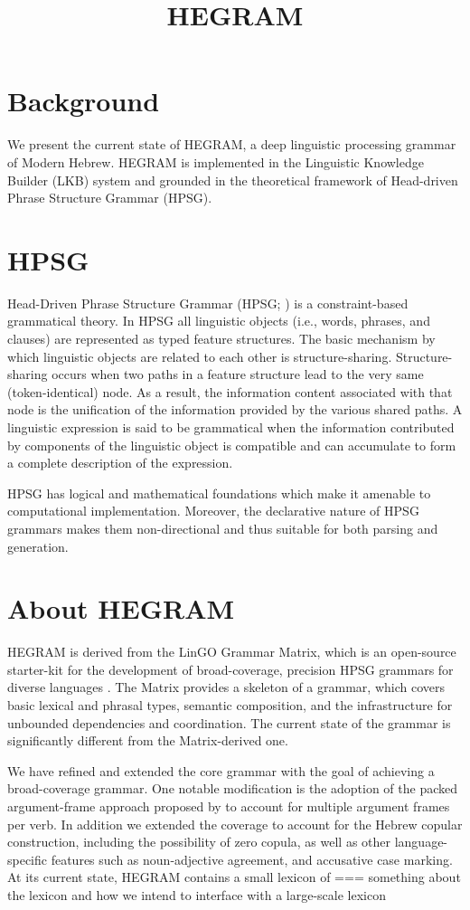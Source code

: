 \documentclass[a4paper]{article}
\title{HEGRAM}
\begin{document}
\section{Background}
We present the current state of HEGRAM, a deep linguistic processing grammar of Modern Hebrew. HEGRAM is implemented in the
Linguistic Knowledge Builder (LKB) system and grounded in the theoretical framework of
Head-driven Phrase Structure Grammar (HPSG).

\section{HPSG}
Head-Driven Phrase Structure Grammar (HPSG; \citealt{PollardSag94}) is  a constraint-based
grammatical theory. In HPSG all linguistic objects (i.e., words, phrases, and clauses) are represented as typed feature structures.
The basic mechanism by which linguistic objects are related to each
other is structure-sharing. Structure-sharing occurs when two paths in a
feature structure lead to the very same (token-identical) node. As a result,
the information content associated with that node is the unification of the
information provided by the various shared paths. A linguistic expression
is said to be grammatical when the information contributed by components
of the linguistic object is compatible and can accumulate to form
a complete description of the expression.

HPSG has logical and mathematical foundations which make it
amenable to computational implementation. Moreover, the declarative nature of HPSG grammars makes them non-directional and thus suitable for both parsing and generation.

\section{About HEGRAM}

HEGRAM is derived from the LinGO Grammar Matrix, which is an open-source starter-kit for the development of broad-coverage, precision HPSG grammars for diverse languages \citep{BenderFlickingerOepen02}. The Matrix provides a skeleton of a grammar, which covers basic lexical and phrasal types, semantic composition, and the infrastructure for unbounded dependencies and coordination. The current state of the grammar is significantly different from the Matrix-derived one.

We have refined and extended the core grammar with the goal of achieving a broad-coverage grammar. One notable modification is the adoption of the packed argument-frame approach proposed by \citet{Haugereid11} to account for multiple argument frames per verb. In addition we extended the coverage to account for the Hebrew copular construction, including the possibility of zero copula, as well as other language-specific features such as noun-adjective agreement, and accusative case marking. At its current state, HEGRAM contains a small lexicon of
=== something about the lexicon and how we intend to interface with a large-scale lexicon
\end{document}
